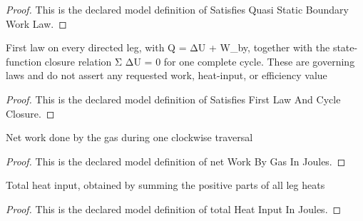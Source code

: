 \begin{proof}
  This is the declared model definition of Satisfies Quasi Static Boundary Work Law.
\end{proof}
\begin{definition}
  \label{def:physics:phyx-mini-0419:phyxminiproblems-problemphyxmini0419-satisfiesfirstlawandcycleclosure}
  First law on every directed leg, with Q = ΔU + W\_by, together with the state-function closure relation Σ ΔU = 0 for one complete cycle. These are governing laws and do not assert any requested work, heat-input, or efficiency value
\end{definition}
\begin{proof}
  This is the declared model definition of Satisfies First Law And Cycle Closure.
\end{proof}
\begin{definition}
  \label{def:physics:phyx-mini-0419:phyxminiproblems-problemphyxmini0419-networkbygasinjoules}
  Net work done by the gas during one clockwise traversal
\end{definition}
\begin{proof}
  This is the declared model definition of net Work By Gas In Joules.
\end{proof}
\begin{definition}
  \label{def:physics:phyx-mini-0419:phyxminiproblems-problemphyxmini0419-totalheatinputinjoules}
  Total heat input, obtained by summing the positive parts of all leg heats
\end{definition}
\begin{proof}
  This is the declared model definition of total Heat Input In Joules.
\end{proof}
